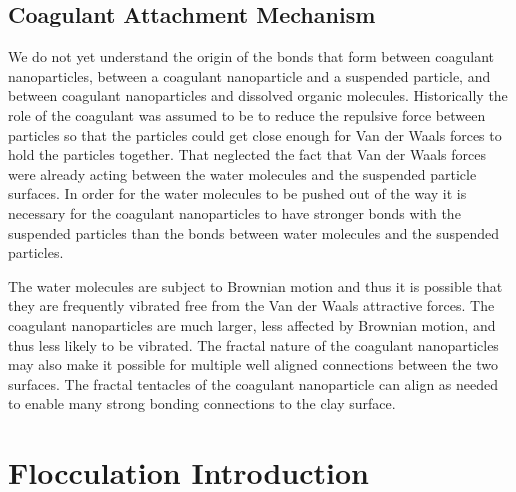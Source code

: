 \documentclass[letterpaper,10pt,english]{sphinxmanual}
\begin{document}
\section{Coagulant Attachment Mechanism}
\label{\detokenize{Rapid_Mix/RM_Theory_and_Future_Work:coagulant-attachment-mechanism}}\label{\detokenize{Rapid_Mix/RM_Theory_and_Future_Work:heading-coagulant-attachment-mechanism}}
We do not yet understand the origin of the bonds that form between coagulant nanoparticles, between a coagulant nanoparticle and a suspended particle, and between coagulant nanoparticles and dissolved organic molecules. Historically the role of the coagulant was assumed to be to reduce the repulsive force between particles so that the particles could get close enough for Van der Waals forces to hold the particles together. That neglected the fact that Van der Waals forces were already acting between the water molecules and the suspended particle surfaces. In order for the water molecules to be pushed out of the way it is necessary for the coagulant nanoparticles to have stronger bonds with the suspended particles than the bonds between water molecules and the suspended particles.

The water molecules are subject to Brownian motion and thus it is possible that they are frequently vibrated free from the Van der Waals attractive forces. The coagulant nanoparticles are much larger, less affected by Brownian motion, and thus less likely to be vibrated. The fractal nature of the coagulant nanoparticles may also make it possible for multiple well aligned connections between the two surfaces. The fractal tentacles of the coagulant nanoparticle can align as needed to enable many strong bonding connections to the clay surface.


\chapter{Flocculation Introduction}
\label{\detokenize{Flocculation/Floc_Intro:flocculation-introduction}}\label{\detokenize{Flocculation/Floc_Intro:title-flocculation-introduction}}\label{\detokenize{Flocculation/Floc_Intro::doc}}
\end{document}
